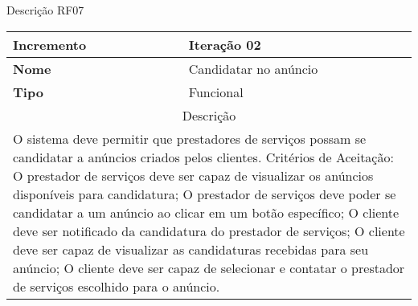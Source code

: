 \begin{quadro}[htb]
	\centering
	\caption{\label{Formatação do texto.}Descrição RF07}	
	\begin{tabular}{|l|p{11cm}|}
		\hline
		\textbf{Incremento}    & Iteração 02\\ \hline
		\textbf{Nome}    & Candidatar no anúncio\\ \hline
		\textbf{Tipo}    & Funcional\\ \hline
		\multicolumn{2}{|c|}{Descrição}\\ \hline
		\multicolumn{2}{|p{12cm}|}{
			O sistema deve permitir que prestadores de serviços possam se candidatar a anúncios criados pelos clientes. \newline
			\newline Critérios de Aceitação: \newline
			O prestador de serviços deve ser capaz de visualizar os anúncios disponíveis para candidatura; \newline
            O prestador de serviços deve poder se candidatar a um anúncio ao clicar em um botão específico; \newline
			O cliente deve ser notificado da candidatura do prestador de serviços; \newline
			O cliente deve ser capaz de visualizar as candidaturas recebidas para seu anúncio; \newline
			O cliente deve ser capaz de selecionar e contatar o prestador de serviços escolhido para o anúncio.
			} \\ \hline
	\end{tabular}
\end{quadro}

